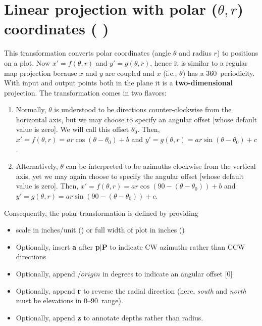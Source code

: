 

\section{Linear projection with polar ($\theta, r$) coordinates ( )}


This transformation converts polar coordinates (angle $\theta$ and radius $r$)
to positions on a plot.  Now $x' = f(\theta,r)$ and $y' = g(\theta,r)$, hence it is similar
to a regular map projection because $x$ and $y$ are coupled and $x$ (i.e., $\theta$) has a 360\DS\ periodicity.
With input and output points both in the plane it is a \textbf{two-dimensional} projection.
The transformation comes in two flavors:

\begin{enumerate}
\item Normally, $\theta$ is understood to be directions counter-clockwise from the horizontal axis, but we may choose
to specify an angular offset [whose default value is zero].  We will call this offset $\theta_0$.
Then, $x' = f(\theta, r) = ar \cos (\theta-\theta_0) + b$ and $y' = g(\theta, r) = ar \sin (\theta-\theta_0) + c$.
\item Alternatively, $\theta$ can be interpreted to be azimuths clockwise from the vertical axis, yet we may again
choose to specify the angular offset [whose default value is zero].
Then, $x' = f(\theta, r) = ar \cos (90 - (\theta-\theta_0)) + b$ and $y' = g(\theta, r) = ar \sin (90 - (\theta-\theta_0)) + c$.
\end{enumerate}

Consequently, the polar transformation is defined by providing

\begin{itemize}
\item scale in inches/unit () or full width of plot in inches ()
\item Optionally, insert \textbf{a} after \textbf{p$|$P} to indicate CW azimuths rather than CCW directions
\item Optionally, append /$origin$ in degrees to indicate an angular offset [0]
\item Optionally, append \textbf{r} to reverse the radial direction (here, {\it south} and {\it north} must be elevations in 0--90\DS\ range).
\item Optionally, append \textbf{z} to annotate depths rather than radius.
\end{itemize}

